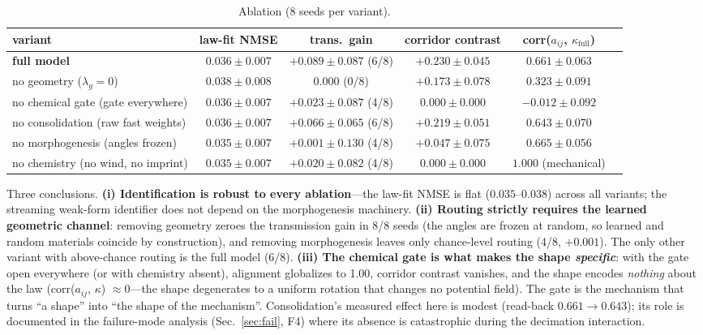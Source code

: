 \documentclass[11pt]{article}
\begin{document}
\begin{table}[h]
\centering\footnotesize
\caption{Ablation (8 seeds per variant).}
\begin{tabular}{L{2.9cm}ccccc}
\toprule
variant & law-fit NMSE & trans.\ gain & corridor contrast & corr($a_{ij}$, $\kappa_{\mathrm{full}}$) \\
\midrule
\textbf{full model} & $0.036 \pm 0.007$ & $+0.089 \pm 0.087$ (6/8) & $+0.230 \pm 0.045$ & $0.661 \pm 0.063$ \\
no geometry ($\lambda_g = 0$) & $0.038 \pm 0.008$ & $0.000$ (0/8) & $+0.173 \pm 0.078$ & $0.323 \pm 0.091$ \\
no chemical gate (gate everywhere) & $0.036 \pm 0.007$ & $+0.023 \pm 0.087$ (4/8) & $0.000 \pm 0.000$ & $-0.012 \pm 0.092$ \\
no consolidation (raw fast weights) & $0.036 \pm 0.007$ & $+0.066 \pm 0.065$ (6/8) & $+0.219 \pm 0.051$ & $0.643 \pm 0.070$ \\
no morphogenesis (angles frozen) & $0.035 \pm 0.007$ & $+0.001 \pm 0.130$ (4/8) & $+0.047 \pm 0.075$ & $0.665 \pm 0.056$ \\
no chemistry (no wind, no imprint) & $0.035 \pm 0.007$ & $+0.020 \pm 0.082$ (4/8) & $0.000 \pm 0.000$ & $1.000$ (mechanical) \\
\bottomrule
\end{tabular}
\end{table}

Three conclusions. \textbf{(i) Identification is robust to every ablation}---the law-fit
NMSE is flat ($0.035$--$0.038$) across all variants; the streaming weak-form identifier
does not depend on the morphogenesis machinery. \textbf{(ii) Routing strictly requires
the learned geometric channel}: removing geometry zeroes the transmission gain in 8/8
seeds (the angles are frozen at random, so learned and random materials coincide by
construction), and removing morphogenesis leaves only chance-level routing (4/8,
$+0.001$). The only other variant with above-chance routing is the full model (6/8).
\textbf{(iii) The chemical gate is what makes the shape \emph{specific}}: with the gate
open everywhere (or with chemistry absent), alignment globalizes to 1.00, corridor
contrast vanishes, and the shape encodes \emph{nothing} about the law
(corr($a_{ij}$, $\kappa$) $\approx 0$---the shape degenerates to a uniform rotation
that changes no potential field). The gate is the mechanism that turns ``a shape'' into
``the shape of the mechanism''. Consolidation's measured effect here is modest
(read-back $0.661 \to 0.643$); its role is documented in the failure-mode analysis
(Sec.~\ref{sec:fail}, F4) where its absence is catastrophic during the decimation
interaction.
\end{document}
